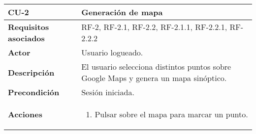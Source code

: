 \begin{longtable}[H]{@{}l|l@{}}
	\toprule
	\begin{minipage}[b]{0.23\columnwidth}\raggedright\strut
		\textbf{CU-2}\strut
	\end{minipage} & \begin{minipage}[b]{0.71\columnwidth}\raggedright\strut
		\textbf{Generación de mapa}\strut
	\end{minipage}\tabularnewline
	\toprule
	\endhead
	\begin{minipage}[t]{0.23\columnwidth}\raggedright\strut
		\textbf{Requisitos asociados}\strut
	\end{minipage} & \begin{minipage}[t]{0.71\columnwidth}\raggedright\strut
		RF-2, RF-2.1, RF-2.2, RF-2.1.1, RF-2.2.1, RF-2.2.2\strut
	\end{minipage}\tabularnewline
	\midrule
	\begin{minipage}[t]{0.23\columnwidth}\raggedright\strut
		\textbf{Actor}\strut
	\end{minipage} & \begin{minipage}[t]{0.71\columnwidth}\raggedright\strut
		Usuario logueado.\strut
	\end{minipage}\tabularnewline
	\midrule
	\begin{minipage}[t]{0.23\columnwidth}\raggedright\strut
		\textbf{Descripción}\strut
	\end{minipage} & \begin{minipage}[t]{0.71\columnwidth}\raggedright\strut
		El usuario selecciona distintos puntos sobre Google Maps y genera un mapa sinóptico.\strut
	\end{minipage}\tabularnewline
	\midrule
	\begin{minipage}[t]{0.23\columnwidth}\raggedright\strut
		\textbf{Precondición}\strut
	\end{minipage} & \begin{minipage}[t]{0.71\columnwidth}\raggedright\strut
		Sesión iniciada.\strut
	\end{minipage}\tabularnewline
	\midrule
	\begin{minipage}[t]{0.23\columnwidth}\raggedright\strut
		\textbf{Acciones}\strut
	\end{minipage} & \begin{minipage}[t]{0.71\columnwidth}\raggedright\strut
		\begin{enumerate}
			\def\labelenumi{\arabic{enumi}.}
			\tightlist
			\item Pulsar sobre el mapa para marcar un punto.

\end{enumerate}
\end{minipage}
\end{longtable}

